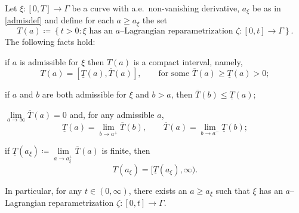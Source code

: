 \documentclass[11pt,a4paper,american]{article}
\newcommand{\ovT}{\overline T}
\begin{document}
    \begin{theo}\label{timeoflagpar}
        Let $\xi:[0,T]\to\Gamma$ be a curve with a.e.\ non-vanishing derivative, $a_\xi$ be as in \cref{admisdef} and define for each $a\ge a_\xi$ the set
        \begin{equation*}
            T(a)\coloneqq\left\{t>0:\text{$\xi$ has an $a$--Lagrangian reparametrization $\zeta:[0,t]\to\Gamma$}\right\}.
        \end{equation*}
        The following facts hold:
        \begin{myenum}
            \item if $a$ is admissible for $\xi$ then $T(a)$ is a compact interval, namely,
            \begin{equation*}
                T(a)=\left[\underline T(a),\ovT(a)\right],\qquad\text{for some }\ovT(a)\ge\underline T(a)>0;
            \end{equation*}
            \item if $a$ and $b$ are both admissible for $\xi$ and $b>a$, then $\ovT(b)\le\underline T(a)$;
            \item $\lim\limits_{a\to\infty}\ovT(a)=0$ and, for any admissible $a$,
            \begin{equation*}
                \underline T(a)=\lim_{b\to a^+}\ovT(b),\qquad\ovT(a)=\lim_{b\to a^-}\underline T(b);
            \end{equation*}
            \item if $\underline T(a_\xi)\coloneqq\lim\limits_{a\to a_\xi^+}\ovT(a)$ is finite, then
            \begin{equation*}
                T(a_\xi)=[\underline T(a_\xi),\infty).
            \end{equation*}
        \end{myenum}
        In particular, for any $t\in(0,\infty)$, there exists an $a\ge a_\xi$ such that $\xi$ has an $a$--Lagrangian reparametrization $\zeta:[0,t]\to\Gamma$.
    \end{theo}
\end{document}
